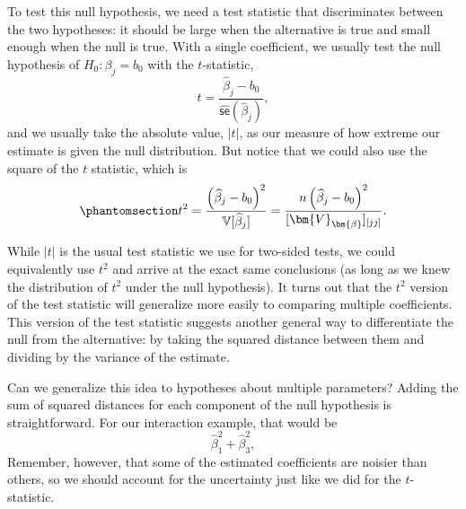 \documentclass[
  13pt,
  letterpaper,
  DIV=11,
  numbers=noendperiod]{scrreprt}
\newcommand{\mb}{\bm}
\newcommand{\V}{\mathbb{V}}
\newcommand{\se}{\textsf{se}}
\newcommand{\bfbeta}{\mb{\beta}}
\theoremstyle{plain}
\theoremstyle{plain}
\theoremstyle{definition}
\theoremstyle{definition}
\theoremstyle{remark}
\begin{document}
To test this null hypothesis, we need a test statistic that
discriminates between the two hypotheses: it should be large when the
alternative is true and small enough when the null is true. With a
single coefficient, we usually test the null hypothesis of
\(H_0: \beta_j = b_0\) with the \(t\)-statistic, \[ 
t = \frac{\widehat{\beta}_{j} - b_{0}}{\widehat{\se}(\widehat{\beta}_{j})},
\] and we usually take the absolute value, \(|t|\), as our measure of
how extreme our estimate is given the null distribution. But notice that
we could also use the square of the \(t\) statistic, which is
\begin{equation}\protect\phantomsection\label{eq-squared-t}{ 
t^{2} = \frac{\left(\widehat{\beta}_{j} - b_{0}\right)^{2}}{\V[\widehat{\beta}_{j}]} = \frac{n\left(\widehat{\beta}_{j} - b_{0}\right)^{2}}{[\mb{V}_{\bfbeta}]_{[jj]}}. 
}\end{equation}

While \(|t|\) is the usual test statistic we use for two-sided tests, we
could equivalently use \(t^2\) and arrive at the exact same conclusions
(as long as we knew the distribution of \(t^2\) under the null
hypothesis). It turns out that the \(t^2\) version of the test statistic
will generalize more easily to comparing multiple coefficients. This
version of the test statistic suggests another general way to
differentiate the null from the alternative: by taking the squared
distance between them and dividing by the variance of the estimate.

Can we generalize this idea to hypotheses about multiple parameters?
Adding the sum of squared distances for each component of the null
hypothesis is straightforward. For our interaction example, that would
be \[ 
\widehat{\beta}_1^2 + \widehat{\beta}_3^2, 
\] Remember, however, that some of the estimated coefficients are
noisier than others, so we should account for the uncertainty just like
we did for the \(t\)-statistic.
\end{document}
